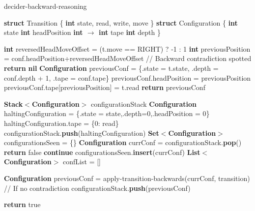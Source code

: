\begin{algorithm}
  \caption{{\sc decider-backward-reasoning}}\label{alg:backward-reasoning}

  \begin{algorithmic}[1]
    \State \textbf{struct} Transition \{
    \State \tabi\textbf{int} state, read, write, move
    \State \}
    \State \textbf{struct} Configuration \{
    \State \tabi\textbf{int} state
    \State \tabi\textbf{int} headPosition
    \State \tabi\textbf{int $\boldsymbol{\to}$ int} tape
    \State \tabi\textbf{int} depth
    \State \}

    \State

    \State \textbf{int} reversedHeadMoveOffset = (t.move == RIGHT) ? -1 : 1
    \State \textbf{int} previousPosition = conf.headPosition+reversedHeadMoveOffset
    \State // Backward contradiction spotted
    \State \textbf{return} \textbf{nil}
    \EndIf
    \State \textbf{Configuration} previousConf = \{.state = t.state, .depth = conf.depth + 1, .tape = conf.tape\}
    \State previousConf.headPosition = previousPosition
    \State previousConf.tape[previousPosition] = t.read
    \State \textbf{return} previousConf
    \EndProcedure
    \State

    \State \textbf{Stack$\boldsymbol{<}$Configuration$\boldsymbol{>}$} configurationStack
    \State \textbf{Configuration} haltingConfiguration = \{.state = state,.depth=0,.headPosition = 0\}
    \State haltingConfiguration.tape = \{0: read\}
    \State configurationStack.\textbf{push}(haltingConfiguration)
    \EndFor
    \State \textbf{Set$\boldsymbol{<}$Configuration$\boldsymbol{>}$} configurationsSeen = \{\}
    \State \textbf{Configuration} currConf = configurationStack.\textbf{pop}()
     \textbf{return} false \EndIf
     \textbf{continue} \EndIf
    \State configurationsSeen.\textbf{insert}(currConf)
    \State \textbf{List$\boldsymbol{<}$Configuration$\boldsymbol{>}$} confList = []

    \State \textbf{Configuration} previousConf = {\sc apply-transition-backwards}(currConf, transition)
    \State // If no contradiction
    \State configurationStack.\textbf{push}(previousConf)
    \EndIf
    \EndFor
    \EndWhile

    \State \textbf{return} true
    \EndProcedure

  \end{algorithmic}
\end{algorithm}

